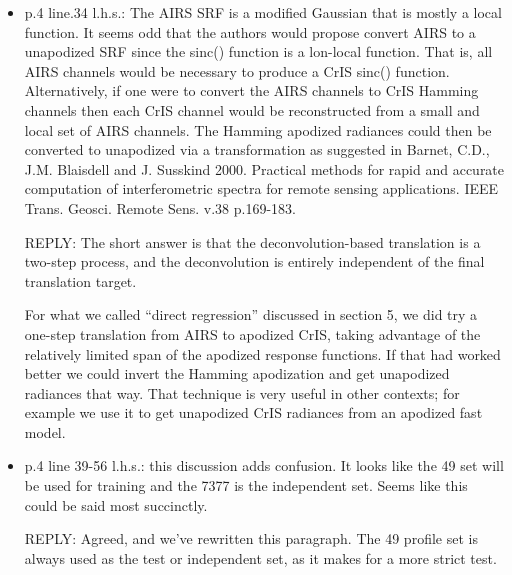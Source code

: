 \documentclass[11pt]{article}
\newcommand {\reply} {\mbox{\small REPLY}}
\begin{document}
\begin{itemize}

  
\item p.4 line.34 l.h.s.: The AIRS SRF is a modified Gaussian that
  is mostly a local function. It seems odd that the authors would
  propose convert AIRS to a unapodized SRF since the sinc() function
  is a lon-local function. That is, all AIRS channels would be
  necessary to produce a CrIS sinc() function. Alternatively, if one
  were to convert the AIRS channels to CrIS Hamming channels then
  each CrIS channel would be reconstructed from a small and local
  set of AIRS channels. The Hamming apodized radiances could then be
  converted to unapodized via a transformation as suggested in
  Barnet, C.D., J.M. Blaisdell and J.  Susskind 2000. Practical
  methods for rapid and accurate computation of interferometric
  spectra for remote sensing applications. IEEE
  Trans. Geosci. Remote Sens. v.38 p.169-183.

  \reply: The short answer is that the deconvolution-based
  translation is a two-step process, and the deconvolution is
  entirely independent of the final translation target.  

  For what we called ``direct regression'' discussed in section 5,
  we did try a one-step translation from AIRS to apodized CrIS,
  taking advantage of the relatively limited span of the apodized
  response functions.  If that had worked better we could invert the
  Hamming apodization and get unapodized radiances that way.  That
  technique is very useful in other contexts; for example we use it
  to get unapodized CrIS radiances from an apodized fast model.

\item p.4 line 39-56 l.h.s.: this discussion adds confusion. It
  looks like the 49 set will be used for training and the 7377 is
  the independent set. Seems like this could be said most
  succinctly.

  \reply: Agreed, and we've rewritten this paragraph.  The 49
  profile set is always used as the test or independent set, as it
  makes for a more strict test.


\end{itemize}
\end{document}
